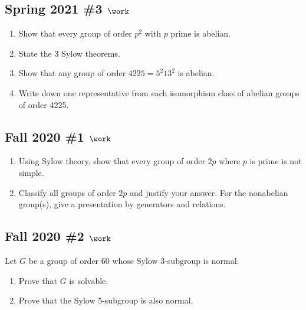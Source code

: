 \hypertarget{spring-2021-3-work}{%
\subsection{\texorpdfstring{Spring 2021 \#3
\(\work\)}{Spring 2021 \#3 \textbackslash work}}\label{spring-2021-3-work}}

\begin{enumerate}
\def\labelenumi{\alph{enumi}.}
\item
  Show that every group of order \(p^2\) with \(p\) prime is abelian.
\item
  State the 3 Sylow theorems.
\item
  Show that any group of order \(4225 = 5^2 13^2\) is abelian.
\item
  Write down one representative from each isomorphism class of abelian
  groups of order 4225.
\end{enumerate}

\hypertarget{fall-2020-1-work}{%
\subsection{\texorpdfstring{Fall 2020 \#1
\(\work\)}{Fall 2020 \#1 \textbackslash work}}\label{fall-2020-1-work}}

\begin{enumerate}
\def\labelenumi{\alph{enumi}.}
\item
  Using Sylow theory, show that every group of order \(2p\) where \(p\)
  is prime is not simple.
\item
  Classify all groups of order \(2p\) and justify your answer. For the
  nonabelian group(s), give a presentation by generators and relations.
\end{enumerate}

\hypertarget{fall-2020-2-work}{%
\subsection{\texorpdfstring{Fall 2020 \#2
\(\work\)}{Fall 2020 \#2 \textbackslash work}}\label{fall-2020-2-work}}

Let \(G\) be a group of order 60 whose Sylow 3-subgroup is normal.

\begin{enumerate}
\def\labelenumi{\alph{enumi}.}
\item
  Prove that \(G\) is solvable.
\item
  Prove that the Sylow 5-subgroup is also normal.
\end{enumerate}

